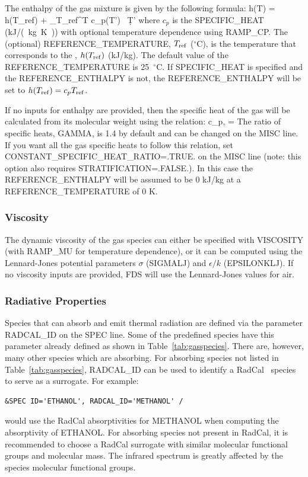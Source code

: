 \documentclass[11pt]{book}
\begin{document}
The enthalpy of the gas mixture is given by the following formula:
\be
   h(T) = h(T_{\rm ref}) + \int_{T_{\rm ref}}^T c_p(T') \, \d T'
\ee
where $c_p$ is the {\ct SPECIFIC\_HEAT} (\si{kJ/(kg.K)}) with optional temperature dependence using {\ct RAMP\_CP}.  The (optional) {\ct REFERENCE\_TEMPERATURE}, $T_{\rm ref}$ ($^\circ$C), is the temperature that corresponds to the , $h(T_{\rm ref})$ (kJ/kg).  The default value of the  {\ct REFERENCE\_TEMPERATURE} is 25~$^\circ$C.  If {\ct SPECIFIC\_HEAT} is specified and the {\ct REFERENCE\_ENTHALPY} is not, the {\ct REFERENCE\_ENTHALPY} will be set to $h(T_{\rm ref})=c_p T_{\rm ref}$.

If no inputs for enthalpy are provided, then the specific heat of the gas will be calculated from its molecular weight using the relation:
\be
   c_{p,\alpha} =  
\ee
The ratio of specific heats, {\ct GAMMA}, is 1.4 by default and can be changed on the {\ct MISC} line. If you want all the gas specific heats to follow this relation, set {\ct CONSTANT\_SPECIFIC\_HEAT\_RATIO=.TRUE.} on the {\ct MISC} line (note: this option also requires {\ct STRATIFICATION=.FALSE.}).  In this case the {\ct REFERENCE\_ENTHALPY} will be assumed to be 0 kJ/kg at a {\ct REFERENCE\_TEMPERATURE} of 0 K.

\subsubsection{Viscosity}

The dynamic viscosity of the gas species can either be specified with {\ct VISCOSITY} (with {\ct RAMP\_MU} for temperature dependence), or it can be computed  using the Lennard-Jones potential parameters $\sigma$ ({\ct SIGMALJ}) and $\epsilon/k$ ({\ct EPSILONKLJ}).  If no viscosity inputs are provided, FDS will use the Lennard-Jones values for air.

\subsubsection{Radiative Properties}
\label{info:radiative_spec_props}

Species that can absorb and emit thermal radiation are defined via the parameter {\ct RADCAL\_ID} on the {\ct SPEC} line.  Some of the predefined species have this parameter already defined as shown in Table~\ref{tab:gasspecies}.  There are, however, many other species which are absorbing.  For absorbing species not listed in Table~\ref{tab:gasspecies}, {\ct RADCAL\_ID} can be used to identify a RadCal~\cite{RadCal} species to serve as a surrogate. For example:
\begin{lstlisting}
&SPEC ID='ETHANOL', RADCAL_ID='METHANOL' /
\end{lstlisting}
would use the RadCal absorptivities for {\ct METHANOL} when computing the absorptivity of {\ct ETHANOL}. For absorbing species not present in RadCal, it is recommended to choose a RadCal surrogate with similar molecular functional groups and molecular mass. The infrared spectrum is greatly affected by the species molecular functional groups.
\end{document}
